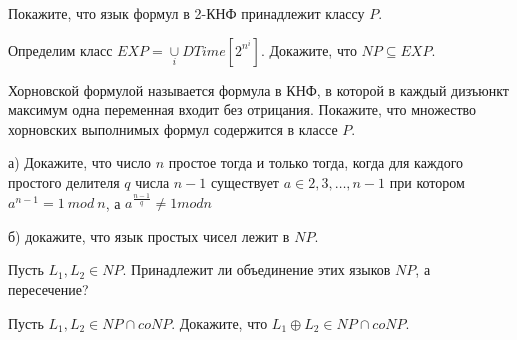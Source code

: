 \setcounter{curtask}{1}


\begin{task}
    Покажите, что язык формул в 2-КНФ принадлежит классу $P$.
\end{task}

\begin{task}
    Определим класс $EXP = \cup\limits_{i}DTime[2^{n^i}]$. Докажите, что
    $NP \subseteq EXP$.
\end{task}

\begin{task}
    Хорновской формулой называется формула в КНФ, в которой в каждый дизъюнкт
    максимум одна переменная входит без отрицания. Покажите, что множество
    хорновских выполнимых формул содержится в классе $P$.
\end{task}

\begin{task}
    а) Докажите, что число $n$ простое тогда и только тогда, когда для каждого
    простого делителя $q$ числа $n - 1$ существует $a \in {2, 3, \dots, n - 1}$ при котором
    $a^{n - 1} = 1~mod~n$, а $a^{\frac{n - 1}{q}} \ne 1 mod n$

    б) докажите, что язык простых чисел лежит в $NP$.
\end{task}

\begin{task}
    Пусть $L_1, L_2 \in NP$. Принадлежит ли объединение этих языков $NP$, а пересечение?
\end{task}

\begin{task}
    Пусть $L_1, L_2 \in NP \cap coNP$. Докажите, что $L_1 \oplus L_2 \in NP \cap coNP$.
\end{task}
